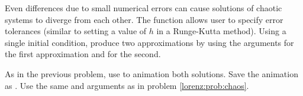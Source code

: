 \begin{problem}
Even differences due to small numerical errors can cause solutions of chaotic systems to diverge from each other.
The  function allows user to specify error tolerances (similar to setting a value of $h$ in a Runge-Kutta method). 
Using a single initial condition, produce two approximations by using the  arguments  for the first approximation and  for the second.

As in the previous problem, use  to animation both solutions. Save the animation as . Use the same  and  arguments as in problem \ref{lorenz:prob:chaos}.
\end{problem}

